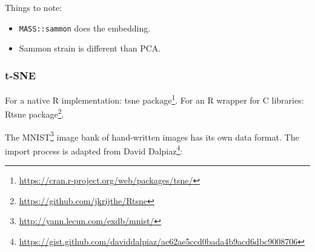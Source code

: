 \documentclass[]{book}
\providecommand{\tightlist}{%
  \setlength{\itemsep}{0pt}\setlength{\parskip}{0pt}}
\renewcommand{\href}[2]{#2\footnote{\url{#1}}}
\theoremstyle{definition}
\theoremstyle{definition}
\theoremstyle{definition}
\theoremstyle{remark}
\begin{document}
Things to note:

\begin{itemize}
\tightlist
\item
  \texttt{MASS::sammon} does the embedding.
\item
  Sammon strain is different than PCA.
\end{itemize}

\hypertarget{t-sne-1}{%
\subsubsection{t-SNE}\label{t-sne-1}}

For a native R implementation: \href{https://cran.r-project.org/web/packages/tsne/}{tsne package}.
For an R wrapper for C libraries: \href{https://github.com/jkrijthe/Rtsne}{Rtsne package}.

The \href{http://yann.lecun.com/exdb/mnist/}{MNIST} image bank of hand-written images has its own data format. The import process is adapted from \href{https://gist.github.com/daviddalpiaz/ae62ae5ccd0bada4b9acd6dbc9008706}{David Dalpiaz}:
\end{document}
